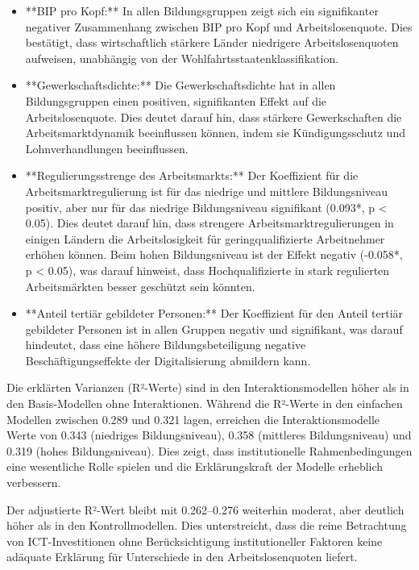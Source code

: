 \begin{itemize}
    \item **BIP pro Kopf:** In allen Bildungsgruppen zeigt sich ein signifikanter negativer 
    Zusammenhang 
    zwischen BIP pro Kopf und Arbeitslosenquote. Dies bestätigt, dass wirtschaftlich stärkere Länder 
    niedrigere Arbeitslosenquoten aufweisen, unabhängig von der Wohlfahrtsstaatenklassifikation.
    
    \item **Gewerkschaftsdichte:** Die Gewerkschaftsdichte hat in allen Bildungsgruppen einen 
    positiven, signifikanten Effekt auf die Arbeitslosenquote. Dies deutet darauf hin, dass stärkere 
    Gewerkschaften die Arbeitsmarktdynamik beeinflussen können, indem sie Kündigungsschutz und 
    Lohnverhandlungen beeinflussen.
    
    \item **Regulierungsstrenge des Arbeitsmarkts:** Der Koeffizient für die Arbeitsmarktregulierung 
    ist für das niedrige und mittlere Bildungsniveau positiv, aber nur für das niedrige 
    Bildungsniveau signifikant (0.093*, p < 0.05). Dies deutet darauf hin, dass strengere 
    Arbeitsmarktregulierungen in einigen Ländern die Arbeitslosigkeit für geringqualifizierte 
    Arbeitnehmer erhöhen können.  Beim hohen Bildungsniveau ist der Effekt negativ 
    (-0.058*, p < 0.05), was darauf hinweist, dass Hochqualifizierte in stark regulierten 
    Arbeitsmärkten besser geschützt sein könnten.
    
    \item **Anteil tertiär gebildeter Personen:** Der Koeffizient für den Anteil tertiär gebildeter 
    Personen ist in allen Gruppen negativ und signifikant, was darauf hindeutet, dass eine höhere 
    Bildungsbeteiligung negative Beschäftigungseffekte der Digitalisierung abmildern kann.
\end{itemize}

Die erklärten Varianzen (R²-Werte) sind in den Interaktionsmodellen höher als in 
den Basis-Modellen ohne Interaktionen. Während die R²-Werte in den einfachen Modellen 
zwischen 0.289 und 0.321 lagen, erreichen die Interaktionsmodelle Werte von 0.343 
(niedriges Bildungsniveau), 0.358 (mittleres Bildungsniveau) und 0.319 (hohes Bildungsniveau). 
Dies zeigt, dass institutionelle Rahmenbedingungen eine wesentliche Rolle spielen und die 
Erklärungskraft der Modelle erheblich verbessern.

Der adjustierte R²-Wert bleibt mit 0.262–0.276 weiterhin moderat, aber deutlich höher als 
in den Kontrollmodellen. Dies unterstreicht, dass die reine Betrachtung von ICT-Investitionen 
ohne Berücksichtigung institutioneller Faktoren keine adäquate Erklärung für Unterschiede in 
den Arbeitslosenquoten liefert.

